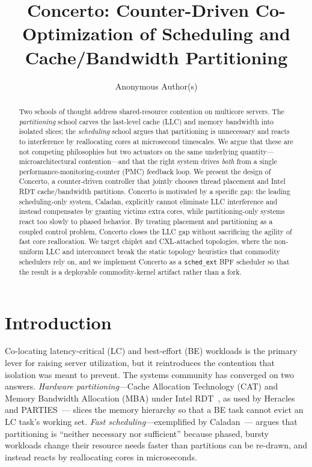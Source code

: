 \documentclass[sigconf,nonacm]{acmart}
\begin{document}
\title{Concerto: Counter-Driven Co-Optimization of Scheduling and
Cache/Bandwidth Partitioning}

\author{Anonymous Author(s)}

\begin{abstract}
Two schools of thought address shared-resource contention on multicore
servers. The \emph{partitioning} school carves the last-level cache (LLC) and
memory bandwidth into isolated slices; the \emph{scheduling} school argues that
partitioning is unnecessary and reacts to interference by reallocating cores at
microsecond timescales. We argue that these are not competing philosophies but
two actuators on the same underlying quantity---microarchitectural
contention---and that the right system drives \emph{both} from a single
performance-monitoring-counter (PMC) feedback loop. We present the design of
Concerto, a counter-driven controller that jointly chooses thread placement and
Intel RDT cache/bandwidth partitions. Concerto is motivated by a specific gap:
the leading scheduling-only system, Caladan, explicitly cannot eliminate LLC
interference and instead compensates by granting victims extra cores, while
partitioning-only systems react too slowly to phased behavior. By treating
placement and partitioning as a coupled control problem, Concerto closes the LLC
gap without sacrificing the agility of fast core reallocation. We target chiplet
and CXL-attached topologies, where the non-uniform LLC and interconnect break
the static topology heuristics that commodity schedulers rely on, and we
implement Concerto as a \texttt{sched\_ext} BPF scheduler so that the result is a
deployable commodity-kernel artifact rather than a fork.
\end{abstract}

\maketitle

\section{Introduction}
Co-locating latency-critical (LC) and best-effort (BE) workloads is the primary
lever for raising server utilization, but it reintroduces the contention that
isolation was meant to prevent. The systems community has converged on two
answers. \emph{Hardware partitioning}---Cache Allocation Technology (CAT) and
Memory Bandwidth Allocation (MBA) under Intel RDT~\cite{intel-rdt,linux-resctrl},
as used by Heracles~\cite{lo2015heracles} and PARTIES~\cite{chen2019parties}---
slices the memory hierarchy so that a BE task cannot evict an LC task's working
set. \emph{Fast scheduling}---exemplified by Caladan~\cite{fried2020caladan}---
argues that partitioning is ``neither necessary nor sufficient'' because phased,
bursty workloads change their resource needs faster than partitions can be
re-drawn, and instead reacts by reallocating cores in microseconds.
\end{document}
